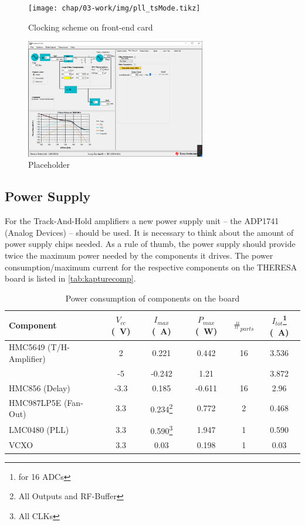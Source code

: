 \begin{figure}[H]
	\centering
	\texttt{[image: chap/03-work/img/pll\_tsMode.tikz]}
	\caption{Clocking scheme on front-end card}
	\label{fig:clocking}
\end{figure}


\begin{figure}[H]
	\centering
	\includegraphics[width = 0.7\textwidth]{chap/03-work/img/pll.png}
	\caption{Placeholder}
	\label{fig:pll}
\end{figure}



\subsection{Power Supply}
For the Track-And-Hold amplifiers a new power supply unit -- the ADP1741 (Analog Devices) -- should be used. It is necessary to think about the amount of power supply chips needed. As a rule of thumb, the power supply should provide twice the maximum power needed by the components it drives. The power consumption/maximum current for the respective components on the THERESA board is listed in \autoref{tab:kapturecomp}. 
\begin{table}[tbh!]
	\caption{Power consumption of components on the board}
	\label{tab:kapturecomp}
	\begin{minipage}{\textwidth}
		\centering
		\begin{tabularx}{\textwidth}{XSSSSS}
			\toprule
			\textbf{Component} & \textbf{$V_{cc}$ (\SI{}{\volt})} & \textbf{$I_{max}$ (\SI{}{\ampere})} & \textbf{$P_{max}$ (\SI{}{\watt})} & $\#_{parts}$ & \textbf{$I_{tot}$}\footnote{for 16 ADCs} (\SI{}{\ampere})\\
				\midrule
			HMC5649 (T/H-Amplifier) 	& 2	  	& 0.221 	 & 0.442 & 16 & 3.536\\
									& -5  	& -0.242 & 1.21 &  & 3.872\\
			HMC856 (Delay) 			& -3.3	& 0.185 & -0.611 & 16 & 2.96\\
			HMC987LP5E (Fan-Out) 	& 3.3 	& 0.234\footnote{All Outputs and RF-Buffer} & 0.772 & 2 & 0.468\\
			LMC0480 (PLL) 			& 3.3 	& 0.590\footnote{All CLKs} & 1.947 & 1 & 0.590\\
			VCXO 					& 3.3 	& 0.03 & 0.198 & 1 & 0.03\\
			\bottomrule
		\end{tabularx}
	\end{minipage}
\end{table}

